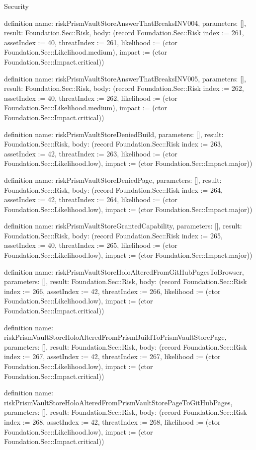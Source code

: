 \begin{lexlean}{Security}
\begin{semanticmodule}
definition{
  name: riskPrismVaultStoreAnswerThatBreaksINV004,
  parameters: [],
  result: Foundation.Sec::Risk,
  body: (record Foundation.Sec::Risk {index := 261, assetIndex := 40, threatIndex := 261, likelihood := (ctor Foundation.Sec::Likelihood.medium), impact := (ctor Foundation.Sec::Impact.critical)})
}

definition{
  name: riskPrismVaultStoreAnswerThatBreaksINV005,
  parameters: [],
  result: Foundation.Sec::Risk,
  body: (record Foundation.Sec::Risk {index := 262, assetIndex := 40, threatIndex := 262, likelihood := (ctor Foundation.Sec::Likelihood.medium), impact := (ctor Foundation.Sec::Impact.critical)})
}

definition{
  name: riskPrismVaultStoreDeniedBuild,
  parameters: [],
  result: Foundation.Sec::Risk,
  body: (record Foundation.Sec::Risk {index := 263, assetIndex := 42, threatIndex := 263, likelihood := (ctor Foundation.Sec::Likelihood.low), impact := (ctor Foundation.Sec::Impact.major)})
}

definition{
  name: riskPrismVaultStoreDeniedPage,
  parameters: [],
  result: Foundation.Sec::Risk,
  body: (record Foundation.Sec::Risk {index := 264, assetIndex := 42, threatIndex := 264, likelihood := (ctor Foundation.Sec::Likelihood.low), impact := (ctor Foundation.Sec::Impact.major)})
}

definition{
  name: riskPrismVaultStoreGrantedCapability,
  parameters: [],
  result: Foundation.Sec::Risk,
  body: (record Foundation.Sec::Risk {index := 265, assetIndex := 40, threatIndex := 265, likelihood := (ctor Foundation.Sec::Likelihood.low), impact := (ctor Foundation.Sec::Impact.major)})
}

definition{
  name: riskPrismVaultStoreHoloAlteredFromGitHubPagesToBrowser,
  parameters: [],
  result: Foundation.Sec::Risk,
  body: (record Foundation.Sec::Risk {index := 266, assetIndex := 42, threatIndex := 266, likelihood := (ctor Foundation.Sec::Likelihood.low), impact := (ctor Foundation.Sec::Impact.critical)})
}

definition{
  name: riskPrismVaultStoreHoloAlteredFromPrismBuildToPrismVaultStorePage,
  parameters: [],
  result: Foundation.Sec::Risk,
  body: (record Foundation.Sec::Risk {index := 267, assetIndex := 42, threatIndex := 267, likelihood := (ctor Foundation.Sec::Likelihood.low), impact := (ctor Foundation.Sec::Impact.critical)})
}

definition{
  name: riskPrismVaultStoreHoloAlteredFromPrismVaultStorePageToGitHubPages,
  parameters: [],
  result: Foundation.Sec::Risk,
  body: (record Foundation.Sec::Risk {index := 268, assetIndex := 42, threatIndex := 268, likelihood := (ctor Foundation.Sec::Likelihood.low), impact := (ctor Foundation.Sec::Impact.critical)})
}


\end{semanticmodule}
\end{lexlean}
